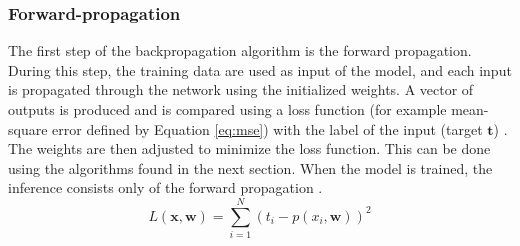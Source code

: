 \subsubsection{Forward-propagation} \label{subs:trainforward}
%
The first step of the backpropagation algorithm is the forward propagation. During this step, the training data are used as input of the model, and each input is propagated through the network using the initialized weights. A vector of outputs is produced and is compared using a loss function (for example mean-square error defined by Equation \eqref{eq:mse}) with the label of the input (target $\boldsymbol{t}$) \cite{matteucci_artificial_2019}. The weights are then adjusted to minimize the loss function. This can be done using the algorithms found in the next section. When the model is trained, the inference consists only of the forward propagation \cite{abdelouahab_accelerating_2018}.
%
\begin{equation}
    L(\boldsymbol{x}, \boldsymbol{w}) = \sum^{N}_{i=1} (t_i - p(x_i, \boldsymbol{w}))^2
    \label{eq:mse}
\end{equation}
